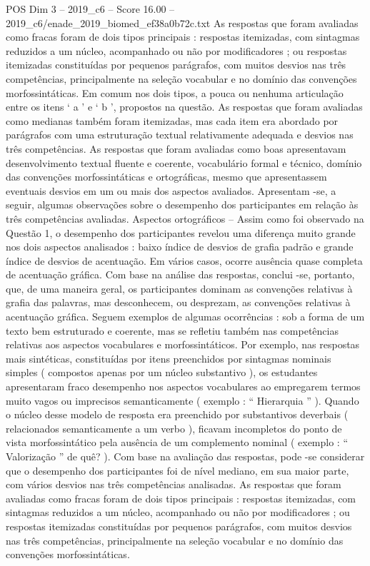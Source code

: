 \begin{textsample}{POS Dim 3 – 2019\_c6 – Score 16.00 – 2019\_c6/enade\_2019\_biomed\_ef38a0b72c.txt}
As respostas que foram avaliadas como fracas foram de dois tipos principais : respostas itemizadas, com sintagmas reduzidos a um núcleo, acompanhado ou não por modificadores ; ou respostas itemizadas constituídas por pequenos parágrafos, com muitos desvios nas três competências, principalmente na seleção vocabular e no domínio das convenções morfossintáticas.
Em comum nos dois tipos, a pouca ou nenhuma articulação entre os itens ‘ a ’ e ‘ b ’, propostos na questão.
As respostas que foram avaliadas como medianas também foram itemizadas, mas cada item era abordado por parágrafos com uma estruturação textual relativamente adequada e desvios nas três competências.
As respostas que foram avaliadas como boas apresentavam desenvolvimento textual fluente e coerente, vocabulário formal e técnico, domínio das convenções morfossintáticas e ortográficas, mesmo que apresentassem eventuais desvios em um ou mais dos aspectos avaliados.
Apresentam -se, a seguir, algumas observações sobre o desempenho dos participantes em relação às três competências avaliadas.
Aspectos ortográficos – Assim como foi observado na Questão 1, o desempenho dos participantes revelou uma diferença muito grande nos dois aspectos analisados : baixo índice de desvios de grafia padrão e grande índice de desvios de acentuação.
Em vários casos, ocorre ausência quase completa de acentuação gráfica.
Com base na análise das respostas, conclui -se, portanto, que, de uma maneira geral, os participantes dominam as convenções relativas à grafia das palavras, mas desconhecem, ou desprezam, as convenções relativas à acentuação gráfica.
Seguem exemplos de algumas ocorrências : sob a forma de um texto bem estruturado e coerente, mas se refletiu também nas competências relativas aos aspectos vocabulares e morfossintáticos.
Por exemplo, nas respostas mais sintéticas, constituídas por itens preenchidos por sintagmas nominais simples ( compostos apenas por um núcleo substantivo ), os estudantes apresentaram fraco desempenho nos aspectos vocabulares ao empregarem termos muito vagos ou imprecisos semanticamente ( exemplo : “ Hierarquia ” ).
Quando o núcleo desse modelo de resposta era preenchido por substantivos deverbais ( relacionados semanticamente a um verbo ), ficavam incompletos do ponto de vista morfossintático pela ausência de um complemento nominal ( exemplo : “ Valorização ” de quê? ).
Com base na avaliação das respostas, pode -se considerar que o desempenho dos participantes foi de nível mediano, em sua maior parte, com vários desvios nas três competências analisadas.
As respostas que foram avaliadas como fracas foram de dois tipos principais : respostas itemizadas, com sintagmas reduzidos a um núcleo, acompanhado ou não por modificadores ; ou respostas itemizadas constituídas por pequenos parágrafos, com muitos desvios nas três competências, principalmente na seleção vocabular e no domínio das convenções morfossintáticas.

\end{textsample}
